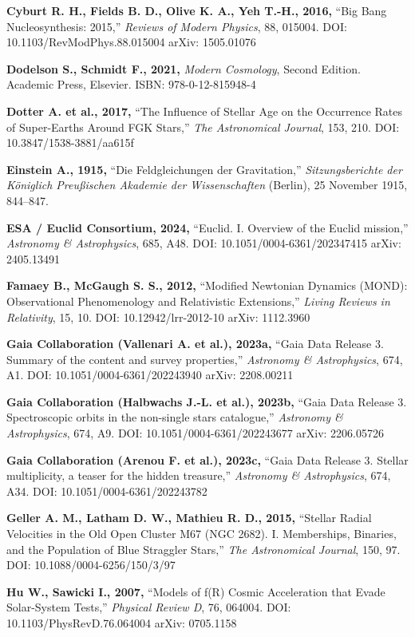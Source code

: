 \documentclass[11pt,a4paper]{article}
\begin{document}
\textbf{Cyburt R. H., Fields B. D., Olive K. A., Yeh T.-H., 2016,} ``Big
Bang Nucleosynthesis: 2015,'' \emph{Reviews of Modern Physics}, 88,
015004. DOI: 10.1103/RevModPhys.88.015004 arXiv: 1505.01076

\textbf{Dodelson S., Schmidt F., 2021,} \emph{Modern Cosmology}, Second
Edition. Academic Press, Elsevier. ISBN: 978-0-12-815948-4

\textbf{Dotter A. et al., 2017,} ``The Influence of Stellar Age on the
Occurrence Rates of Super-Earths Around FGK Stars,'' \emph{The
Astronomical Journal}, 153, 210. DOI: 10.3847/1538-3881/aa615f

\textbf{Einstein A., 1915,} ``Die Feldgleichungen der Gravitation,''
\emph{Sitzungsberichte der Königlich Preußischen Akademie der
Wissenschaften} (Berlin), 25 November 1915, 844--847.

\textbf{ESA / Euclid Consortium, 2024,} ``Euclid. I. Overview of the
Euclid mission,'' \emph{Astronomy \& Astrophysics}, 685, A48. DOI:
10.1051/0004-6361/202347415 arXiv: 2405.13491

\textbf{Famaey B., McGaugh S. S., 2012,} ``Modified Newtonian Dynamics
(MOND): Observational Phenomenology and Relativistic Extensions,''
\emph{Living Reviews in Relativity}, 15, 10. DOI: 10.12942/lrr-2012-10
arXiv: 1112.3960

\textbf{Gaia Collaboration (Vallenari A. et al.), 2023a,} ``Gaia Data
Release 3. Summary of the content and survey properties,''
\emph{Astronomy \& Astrophysics}, 674, A1. DOI:
10.1051/0004-6361/202243940 arXiv: 2208.00211

\textbf{Gaia Collaboration (Halbwachs J.-L. et al.), 2023b,} ``Gaia Data
Release 3. Spectroscopic orbits in the non-single stars catalogue,''
\emph{Astronomy \& Astrophysics}, 674, A9. DOI:
10.1051/0004-6361/202243677 arXiv: 2206.05726

\textbf{Gaia Collaboration (Arenou F. et al.), 2023c,} ``Gaia Data
Release 3. Stellar multiplicity, a teaser for the hidden treasure,''
\emph{Astronomy \& Astrophysics}, 674, A34. DOI:
10.1051/0004-6361/202243782

\textbf{Geller A. M., Latham D. W., Mathieu R. D., 2015,} ``Stellar
Radial Velocities in the Old Open Cluster M67 (NGC 2682). I.
Memberships, Binaries, and the Population of Blue Straggler Stars,''
\emph{The Astronomical Journal}, 150, 97. DOI:
10.1088/0004-6256/150/3/97

\textbf{Hu W., Sawicki I., 2007,} ``Models of f(R) Cosmic Acceleration
that Evade Solar-System Tests,'' \emph{Physical Review D}, 76, 064004.
DOI: 10.1103/PhysRevD.76.064004 arXiv: 0705.1158
\end{document}
